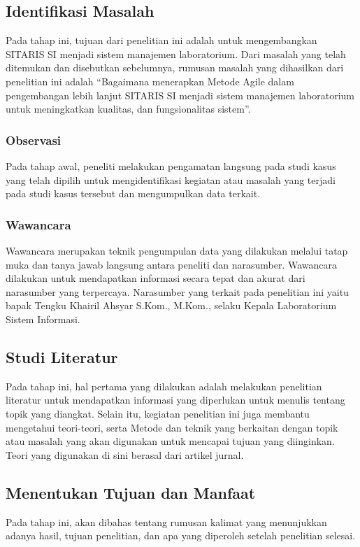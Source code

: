 \subsection{Identifikasi Masalah}
Pada tahap ini, tujuan dari penelitian ini adalah untuk mengembangkan SITARIS SI menjadi sistem manajemen laboratorium. Dari masalah yang telah ditemukan dan disebutkan sebelumnya, rumusan masalah yang dihasilkan dari penelitian ini adalah “Bagaimana menerapkan Metode Agile dalam pengembangan lebih lanjut SITARIS SI menjadi sistem manajemen laboratorium untuk meningkatkan kualitas, dan fungsionalitas sistem”.

\subsubsection{Observasi}
Pada tahap awal, peneliti melakukan pengamatan langsung pada studi kasus yang telah dipilih untuk mengidentifikasi kegiatan atau masalah yang terjadi pada studi kasus tersebut dan mengumpulkan data terkait.

\subsubsection{Wawancara}
Wawancara merupakan teknik pengumpulan data yang dilakukan melalui tatap muka dan tanya jawab langsung antara peneliti dan narasumber. Wawancara dilakukan untuk mendapatkan informasi secara tepat dan akurat dari narasumber yang terpercaya. Narasumber yang terkait pada penelitian ini yaitu bapak Tengku Khairil Ahsyar S.Kom., M.Kom., selaku Kepala Laboratorium Sistem Informasi.

\subsection{Studi Literatur}
Pada tahap ini, hal pertama yang dilakukan adalah melakukan penelitian literatur untuk mendapatkan informasi yang diperlukan untuk menulis tentang topik yang diangkat. Selain itu, kegiatan penelitian ini juga membantu mengetahui teori-teori, serta Metode dan teknik yang berkaitan dengan topik atau masalah yang akan digunakan untuk mencapai tujuan yang diinginkan. Teori yang digunakan di sini berasal dari artikel jurnal.

\subsection{Menentukan Tujuan dan Manfaat}
Pada tahap ini, akan dibahas tentang rumusan kalimat yang menunjukkan adanya hasil, tujuan penelitian, dan apa yang diperoleh setelah penelitian selesai.

